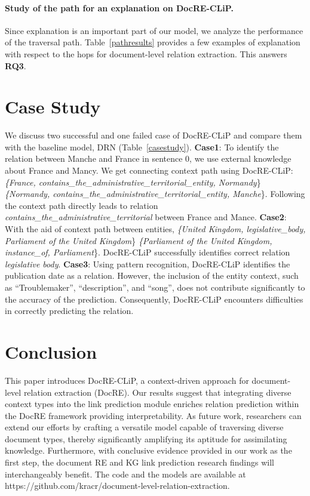 \documentclass[letterpaper]{article} %
\begin{document}
\paragraph{\textbf{Study of the path for an explanation on DocRE-CLiP.}} Since explanation is an important part of our model, we analyze the performance of the traversal path. Table~\ref{pathresults} provides a few examples of explanation with respect to the hops for document-level relation extraction. This answers \textbf{RQ3}.

\section{Case Study}
We discuss two successful and one failed case of DocRE-CLiP and compare them with the baseline model, DRN (Table~\ref{casestudy}). 
\textbf{Case1}: To identify the relation between Manche and France in sentence 0, we use external knowledge about France and Mancy.
We get connecting context path using DocRE-CLiP: 
\textit{\{France, contains\_the\_administrative\_territorial\_entity, Normandy}\} 
\textit{\{Normandy, contains\_the\_administrative\_territorial\_entity, Manche}\}. 
Following the context path directly leads to relation \textit{contains\_the\_administrative\_territorial} between France and Mance. \textbf{Case2}:
With the aid of context path between entities,
\textit{\{United Kingdom, legislative\_body,	Parliament of the United Kingdom}\}  
\textit{\{Parliament of the United Kingdom,	instance\_of,	Parliament}\}. 
DocRE-CLiP successfully identifies correct relation \textit{legislative body}. \textbf{Case3}: Using pattern recognition, DocRE-CLiP identifies the publication date as a relation. However, the inclusion of the entity context, such as \enquote{Troublemaker}, \enquote{description}, and \enquote{song}, does not contribute significantly to the accuracy of the prediction. Consequently, DocRE-CLiP encounters difficulties in correctly predicting the relation.



\section{Conclusion}
This paper introduces DocRE-CLiP, a context-driven approach for document-level relation extraction (DocRE). Our results suggest that integrating diverse context types into the link prediction module enriches relation prediction within the DocRE framework providing interpretability. As future work, researchers can extend our efforts by crafting a versatile model capable of traversing diverse document types, thereby significantly amplifying its aptitude for assimilating knowledge. Furthermore, with conclusive evidence provided in our work as the first step, the document RE and KG link prediction research findings will interchangeably benefit. The code and the models are available at https://github.com/kracr/document-level-relation-extraction.
\end{document}
